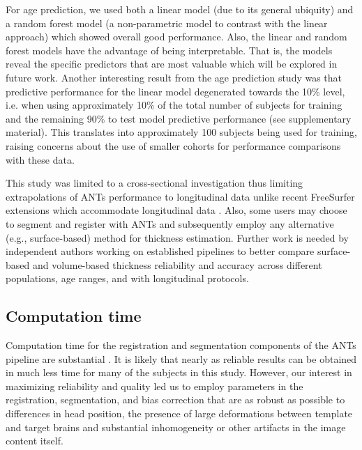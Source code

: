 For age prediction,
we used both a linear model (due to its general ubiquity) and a random
forest model (a non-parametric model to contrast with the linear approach)
which showed overall good performance.  Also, the linear  and
random forest models have the advantage of being
interpretable.  That is, the models reveal the specific predictors
that are most valuable which will be explored in future work.  
Another interesting result from the age prediction study was that 
predictive performance for the linear model degenerated towards the 10\% level, i.e. 
when using approximately 10\% of the total number of subjects for 
training and the remaining 90\% to test model predictive performance 
(see supplementary material).
This translates into approximately 100 subjects being used for training,
raising concerns about the use of smaller cohorts for performance comparisons
with these data.

This study was limited to a cross-sectional investigation thus limiting
extrapolations of ANTs performance to longitudinal data unlike
recent FreeSurfer extensions which accommodate longitudinal data \citep{reuter2012,jovicich2013}.  
Also, some users may choose to segment and register
with ANTs and subsequently employ any alternative (e.g., surface-based)
method for thickness estimation.  Further work is needed by
independent authors working on established pipelines 
to better compare surface-based and volume-based thickness reliability
and accuracy across different populations, age ranges, and with 
longitudinal protocols. 

\subsection{Computation time}
Computation time for the registration and segmentation components of
the ANTs pipeline are substantial {\color{blue}{but are not significantly worse than
those of FreeSurfer}}.  It is likely that nearly as reliable
results can be obtained in much less time for many of the subjects in
this study.  However, our interest in
maximizing reliability and quality led us to employ parameters in the
registration, segmentation, and bias correction that are as robust as
possible to differences in head position, the presence of large
deformations between template and target brains and substantial
inhomogeneity or other artifacts in the image content itself.  

